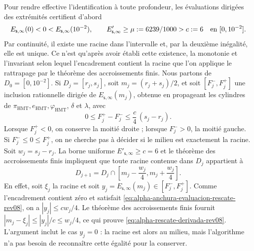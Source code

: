 Pour rendre effective l'identification à toute profondeur, les évaluations
dirigées des extrémités certifient d'abord
\[
 E_{\mathsf s,\infty}(0)<0<
 E_{\mathsf s,\infty}(10^{-2}),
 \qquad
 E'_{\mathsf s,\infty}\geq\mu:=6239/1000>c:=6
 \quad\hbox{en }[0,10^{-2}].
\]
Par continuité, il existe une racine dans l'intervalle et, par la deuxième inégalité, elle est unique. Ce n'est qu'après avoir établi cette existence, la monotonie et l'invariant selon lequel l'encadrement contient la racine que l'on applique le rattrapage par le théorème des accroissements finis. Nous partons de \(D_0=[0,10^{-2}]\). Si \(D_j=[r_j,s_j]\), soit \(m_j=(r_j+s_j)/2\), et soit \([F_j^-,F_j^+]\) une inclusion rationnelle dirigée de \(E_{\mathsf s,\infty}(m_j)\), obtenue en propageant les cylindres de \(\pi_{\mathrm{HMT}},e_{\mathrm{HMT}},\varphi_{\mathrm{HMT}}\), \(\delta\) et \(\lambda\), avec
\begin{equation}
 0\leq F_j^+-F_j^-\leq \frac{c}{4}\,(s_j-r_j).
 \label{eq:alpha-anchura-evaluacion-rescate-rev08}
\end{equation}
Lorsque \(F_j^+<0\), on conserve la moitié droite ;
lorsque \(F_j^->0\), la moitié gauche. Si
\(F_j^-\leq0\leq F_j^+\), on ne cherche pas à décider si le milieu est
exactement la racine. Soit \(w_j=s_j-r_j\). La borne uniforme
\(E'_{\mathsf s,\infty}\geq c=6\) et le théorème des accroissements finis impliquent que
toute racine contenue dans \(D_j\) appartient à
\begin{equation}
 D_{j+1}=D_j\cap
 \left[m_j-\frac{w_j}{4},
             m_j+\frac{w_j}{4}\right].
 \label{eq:alpha-rescate-derivada-rev08}
\end{equation}
En effet, soit \(\xi_j\) la racine et soit
\(y_j=E_{\mathsf s,\infty}(m_j)\in[F_j^-,F_j^+]\). Comme l'encadrement contient
zéro et satisfait \eqref{eq:alpha-anchura-evaluacion-rescate-rev08}, on a
\(|y_j|\leq cw_j/4\). Le théorème des accroissements finis fournit
\(|m_j-\xi_j|\leq |y_j|/c\leq w_j/4\), ce qui prouve
\eqref{eq:alpha-rescate-derivada-rev08}. L'argument inclut le cas
\(y_j=0\) : la racine est alors au milieu, mais l'algorithme n'a pas
besoin de reconnaître cette égalité pour la conserver.

